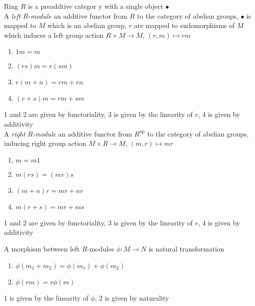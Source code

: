 \documentclass[main]{subfiles}
\begin{document}
\begin{definition}\label{Module}
Ring $R$ is a preaddtive categor
y with a single object $\bullet$ \\
A \textit{left} $R$-\textit{module} an additive functor from $R$ to the category of abelian groups, $\bullet$ is mapped to $M$ which is an abelian group, $r$ are mapped to endomorphisms of $M$ which induces a left group action $R\times M\to M$, $(r,m)\mapsto rm$
\begin{enumerate}
\item $1m=m$
\item $(rs)m=r(sm)$
\item $r(m+n)=rm+rn$
\item $(r+s)m=rm+sm$
\end{enumerate}
1 and 2 are given by functoriality, 3 is given by the linearity of $r$, 4 is given by additivity \\
A \textit{right} $R$-\textit{module} an additive functor from $R^\mathrm{op}$ to the category of abelian groups, inducing right group action $M\times R\to M$, $(m,r)\mapsto mr$
\begin{enumerate}
\item $m=m1$
\item $m(rs)=(mr)s$
\item $(m+n)r=mr+nr$
\item $m(r+s)=mr+ms$
\end{enumerate}
1 and 2 are given by functoriality, 3 is given by the linearity of $r$, 4 is given by additivity
\end{definition}

\begin{definition}
A morphism between left $R$-modules $\phi:M\to N$ is natural transformation
\begin{enumerate}
\item $\phi(m_1+m_2)=\phi(m_1)+\phi(m_2)$
\item $\phi(rm)=r\phi(m)$
\end{enumerate}
\begin{center}
\end{center}
1 is given by the linearity of $\phi$, 2 is given by naturality
\end{definition}
\end{document}
